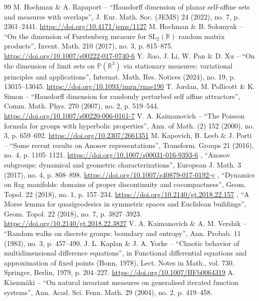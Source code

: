 \begin{thebibliography}{99}
 M. Hochman \& A. Rapaport – “Hausdorff dimension of planar self-affine sets and measures with overlaps”, J. Eur. Math. Soc. (JEMS) 24 (2022), no. 7, p. 2361–2441. \url{https://doi.org/10.4171/jems/1127}
 M. Hochman \& B. Solomyak – “On the dimension of Furstenberg measure for $\mathrm{SL}_2(\mathbb{R})$ random matrix products”, Invent. Math. 210 (2017), no. 3, p. 815–875. \url{https://doi.org/10.1007/s00222-017-0740-6}
 Y. Jiao, J. Li, W. Pan \& D. Xu – “On the dimension of limit sets on $\mathbb{P} (\mathbb{R}^3)$ via stationary measures: variational principles and applications”, Internat. Math. Res. Notices (2024), no. 19, p. 13015–13045. \url{https://doi.org/10.1093/imrn/rnae190}
 T. Jordan, M. Pollicott \& K. Simon – “Hausdorff dimension for randomly perturbed self affine attractors”, Comm. Math. Phys. 270 (2007), no. 2, p. 519–544. \url{https://doi.org/10.1007/s00220-006-0161-7}
 V. A. Kaimanovich – “The Poisson formula for groups with hyperbolic properties”, Ann. of Math. (2) 152 (2000), no. 3, p. 659–692. \url{https://doi.org/10.2307/2661351}
 M. Kapovich, B. Leeb \& J. Porti – “Some recent results on Anosov representations”, Transform. Groups 21 (2016), no. 4, p. 1105–1121. \url{https://doi.org/10.1007/s00031-016-9393-6}
 \textemdash{}, “Anosov subgroups: dynamical and geometric characterizations”, European J. Math. 3 (2017), no. 4, p. 808–898. \url{https://doi.org/10.1007/s40879-017-0192-y}
 \textemdash{}, “Dynamics on flag manifolds: domains of proper discontinuity and cocompactness”, Geom. Topol. 22 (2018), no. 1, p. 157–234. \url{https://doi.org/10.2140/gt.2018.22.157}
 \textemdash{}, “A Morse lemma for quasigeodesics in symmetric spaces and Euclidean buildings”, Geom. Topol. 22 (2018), no. 7, p. 3827–3923. \url{https://doi.org/10.2140/gt.2018.22.3827}
 V. A. Kaimanovich \& A. M. Vershik – “Random walks on discrete groups: boundary and entropy”, Ann. Probab. 11 (1983), no. 3, p. 457–490. 
 J. L. Kaplan \& J. A. Yorke – “Chaotic behavior of multidimensional difference equations”, in Functional differential equations and approximation of fixed points (Bonn, 1978), Lect. Notes in Math., vol. 730, Springer, Berlin, 1979, p. 204–227. \url{https://doi.org/10.1007/BFb0064319}
 A. Käenmäki – “On natural invariant measures on generalised iterated function systems”, Ann. Acad. Sci. Fenn. Math. 29 (2004), no. 2, p. 419–458. 

\end{thebibliography}
